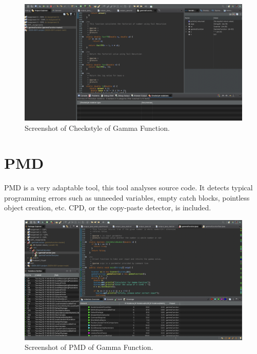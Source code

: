 \documentclass[a4paper, 11pt]{article}
\begin{document}
\begin{figure}[h]
    \centering
    \includegraphics[width=0.9\linewidth]{Images/Typechecking.jpg}
    \caption{Screenshot of Checkstyle of Gamma Function.}
    \label{fig: Checkstyle tool}
\end{figure}

\newpage

\section{PMD}
PMD is a very adaptable tool, this tool analyses source code. It detects typical programming errors such as unneeded variables, empty catch blocks, pointless object creation, etc. CPD, or the copy-paste detector, is included.\\

\begin{figure}[h]
    \centering
    \includegraphics[width=0.9\linewidth]{Images/pmd.jpg}
    \caption{Screenshot of PMD of Gamma Function.}
    \label{fig:PMD}
\end{figure}
\end{document}
